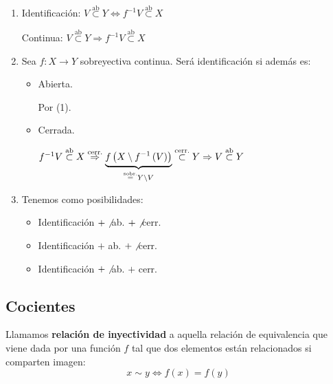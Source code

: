 \begin{obs}
\begin{enumerate}
    \item Identificación: $V \stackrel{\text{ab}}{\subset} Y \Leftrightarrow f^{-1}V \stackrel{\text{ab}}{\subset} X$

    Continua: $V \stackrel{\text{ab}}{\subset } Y \Rightarrow f^{-1}V \stackrel{\text{ab}}{\subset} X$

    \item Sea $f: X \rightarrow Y$ sobreyectiva continua. Será identificación si además es:
    \begin{itemize}
        \item Abierta. 
        \begin{demo}
            Por (1).
        \end{demo}
        \item Cerrada.
        \begin{demo}
            $f^{-1}V \stackrel{\text{ab}}{\subset} X \stackrel{\text{cerr.}}{\Rightarrow} \underbrace{f \left( X \setminus f^{-1}\left( V \right) \right)}_{\stackrel{\text{sobr.}}{=} Y\setminus V}  \stackrel{\text{cerr.}}{\subset} Y \Rightarrow V \stackrel{\text{ab}}{\subset} Y$
        \end{demo}
    \end{itemize}

    \item Tenemos como posibilidades:
    \begin{itemize}
        \item Identificación $+ \not$ ab. $+ \not$ cerr.
        \item Identificación $+$ ab. $+ \not$ cerr.
        \item Identificación $+ \not$ ab. $+$ cerr.
    \end{itemize}
\end{enumerate}
\end{obs}

\subsection{Cocientes}
\label{sub:cocientes}
\begin{defi}
Llamamos \textbf{relación de inyectividad} a aquella relación de equivalencia que viene dada por una función $f$ tal que dos elementos están relacionados si comparten imagen:
\[
x \sim y \Leftrightarrow f\left( x \right) = f\left( y \right)
\]
\end{defi}


